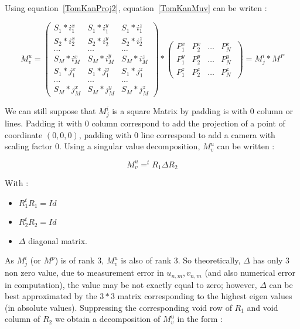 Using equation~\ref{TomKanProj2}, equation~\ref{TomKanMuv} can be writen :


\begin{equation}
   M^u_v= \left( \begin{array}{ccc} 
             S_1*i^x_1 & S_1*i^y_1 & S_1*i^z_1 \\
             S_2*i^x_2 & S_2*i^y_2 & S_2*i^z_2 \\
             \dots & \dots & \dots \\
             S_M*i^x_M & S_M*i^y_M & S_M*i^z_M \\
             S_1*j^x_1 & S_1* j^y_1 & S_1* j^z_1 \\
             \dots & \dots & \dots \\
             S_M*j^x_M & S_M*j^y_M & S_M*j^z_M 
        \end{array} 
\right)
       *
        \left( \begin{array}{cccc} 
             P^x_1 & P^x_2 &  \dots & P^x_N \\
             P^y_1 & P^y_2 &  \dots & P^y_N \\
             P^z_1 & P^z_2 &  \dots & P^z_N \
        \end{array} 
        \right)
     = M^i_j * M^P
    \label{TomKanFactMUV}
\end{equation}



We can still
suppose that $M^i_j$ is a square Matrix by padding is with $0$ column or lines.
Padding it with $0$ column correspond to add the projection of a point of coordinate
 $(0,0,0)$, padding with $0$ line correspond to add a camera with scaling factor $0$.
Using a singular value decomposition, $M^u_v$ can be written :


\begin{equation}
   M^u_v=   ^t R_1 \Delta R_2
\end{equation}

With  :

\begin{itemize}
   \item  $R_1 ^t R_1 = Id$  
   \item  $R_2 ^t R_2 = Id$  
   \item  $\Delta$ diagonal matrix.
\end{itemize}

As $M^i_j$ (or $M^p$) is of rank $3$, $M^u_v$ is also of rank $3$.  So  theoretically, $\Delta$  has only $3$
non zero value, due to measurement  error in $u_{n,m},v_{n,m}$ (and also numerical error in computation), the value may be not exactly equal to zero; however,
 $\Delta$  can be best approximated by the $3*3$ matrix corresponding to the highest eigen values (in
absolute values). Suppressing
the corresponding void row of $R_1$ and void column of $R_2$ we obtain a
decomposition of $M^u_v$ in the form :

